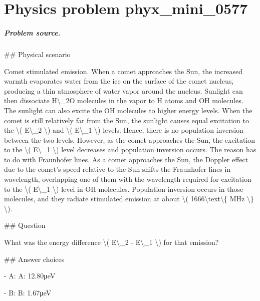 
\chapter{Physics problem phyx\_mini\_0577}
\label{ch:PhyXMiniProblems_problem_phyx_mini_0577}

\paragraph{Problem source.}
\#\# Physical scenario

Comet stimulated emission. When a comet approaches the Sun, the increased warmth evaporates water from the ice on the surface of the comet nucleus, producing a thin atmosphere of water vapor around the nucleus. Sunlight can then dissociate H\textbackslash{}\_2O molecules in the vapor to H atoms and OH molecules. The sunlight can also excite the OH molecules to higher energy levels. When the comet is still relatively far from the Sun, the sunlight causes equal excitation to the \textbackslash{}( E\textbackslash{}\_2 \textbackslash{}) and \textbackslash{}( E\textbackslash{}\_1 \textbackslash{}) levels. Hence, there is no population inversion between the two levels. However, as the comet approaches the Sun, the excitation to the \textbackslash{}( E\textbackslash{}\_1 \textbackslash{}) level decreases and population inversion occurs. The reason has to do with Fraunhofer lines. As a comet approaches the Sun, the Doppler effect due to the comet's speed relative to the Sun shifts the Fraunhofer lines in wavelength, overlapping one of them with the wavelength required for excitation to the \textbackslash{}( E\textbackslash{}\_1 \textbackslash{}) level in OH molecules. Population inversion occurs in those molecules, and they radiate stimulated emission at about \textbackslash{}( 1666\textbackslash{}text\textbackslash{}\{ MHz \textbackslash{}\} \textbackslash{}).

\#\# Question

What was the energy difference \textbackslash{}( E\textbackslash{}\_2 - E\textbackslash{}\_1 \textbackslash{}) for that emission?

\#\# Answer choices

- A: A: 12.80μeV

- B: B: 1.67μeV

